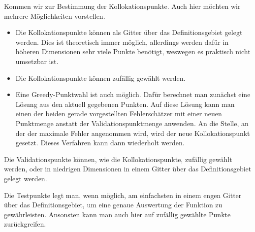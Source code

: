 Kommen wir zur Bestimmung der Kollokationspunkte. Auch hier möchten wir mehrere Möglichkeiten vorstellen.
\begin{itemize}
\item
Die Kollokationspunkte können als Gitter über das Definitionsgebiet gelegt werden. Dies ist theoretisch immer möglich, allerdings werden dafür in höheren Dimensionen sehr viele Punkte benötigt, weswegen es praktisch nicht umsetzbar ist. 
\item
Die Kollokationspunkte können zufällig gewählt werden.
\item
Eine Greedy-Punktwahl ist auch möglich. Dafür berechnet man zunächst eine Lösung aus den aktuell gegebenen Punkten. Auf diese Lösung kann man einen der beiden gerade vorgestellten Fehlerschätzer mit einer neuen Punktmenge anstatt der Validationspunktmenge anwenden. An die Stelle, an der der maximale Fehler angenommen wird, wird der neue Kollokationspunkt gesetzt. Dieses Verfahren kann dann wiederholt werden.
\end{itemize}

Die Validationspunkte können, wie die Kollokationspunkte, zufällig gewählt werden, oder in niedrigen Dimensionen in einem Gitter über das Definitionsgebiet gelegt werden.

Die Testpunkte legt man, wenn möglich, am einfachsten in einem engen Gitter über das Definitionsgebiet, um eine genaue Auswertung der Funktion zu gewährleisten. Ansonsten kann man auch hier auf zufällig gewählte Punkte zurückgreifen.